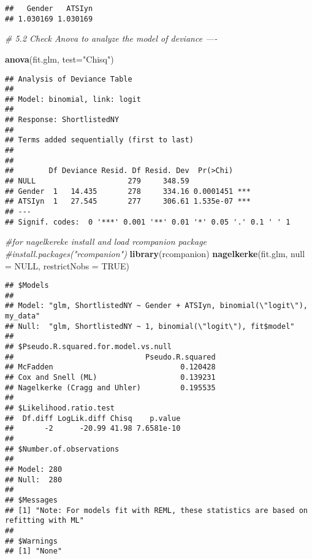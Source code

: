\documentclass[]{article}
\newenvironment{Shaded}{\begin{snugshade}}{\end{snugshade}}
\newcommand{\KeywordTok}[1]{\textcolor[rgb]{0.13,0.29,0.53}{\textbf{#1}}}
\newcommand{\DataTypeTok}[1]{\textcolor[rgb]{0.13,0.29,0.53}{#1}}
\newcommand{\StringTok}[1]{\textcolor[rgb]{0.31,0.60,0.02}{#1}}
\newcommand{\CommentTok}[1]{\textcolor[rgb]{0.56,0.35,0.01}{\textit{#1}}}
\newcommand{\OtherTok}[1]{\textcolor[rgb]{0.56,0.35,0.01}{#1}}
\newcommand{\NormalTok}[1]{#1}
\begin{document}
\begin{verbatim}
##   Gender   ATSIyn 
## 1.030169 1.030169
\end{verbatim}

\begin{Shaded}
\begin{Highlighting}[]
\CommentTok{# 5.2 Check Anova to analyze the model of deviance ----}

\KeywordTok{anova}\NormalTok{(fit.glm, }\DataTypeTok{test=}\StringTok{"Chisq"}\NormalTok{)}
\end{Highlighting}
\end{Shaded}

\begin{verbatim}
## Analysis of Deviance Table
## 
## Model: binomial, link: logit
## 
## Response: ShortlistedNY
## 
## Terms added sequentially (first to last)
## 
## 
##        Df Deviance Resid. Df Resid. Dev  Pr(>Chi)    
## NULL                     279     348.59              
## Gender  1   14.435       278     334.16 0.0001451 ***
## ATSIyn  1   27.545       277     306.61 1.535e-07 ***
## ---
## Signif. codes:  0 '***' 0.001 '**' 0.01 '*' 0.05 '.' 0.1 ' ' 1
\end{verbatim}

\begin{Shaded}
\begin{Highlighting}[]
\CommentTok{#for nagelkereke install and load rcompanion package}
\CommentTok{#install.packages("rcompanion") }
\KeywordTok{library}\NormalTok{(rcompanion)}
\KeywordTok{nagelkerke}\NormalTok{(fit.glm, }\DataTypeTok{null =} \OtherTok{NULL}\NormalTok{, }\DataTypeTok{restrictNobs =} \OtherTok{TRUE}\NormalTok{)}
\end{Highlighting}
\end{Shaded}

\begin{verbatim}
## $Models
##                                                                            
## Model: "glm, ShortlistedNY ~ Gender + ATSIyn, binomial(\"logit\"), my_data"
## Null:  "glm, ShortlistedNY ~ 1, binomial(\"logit\"), fit$model"            
## 
## $Pseudo.R.squared.for.model.vs.null
##                              Pseudo.R.squared
## McFadden                             0.120428
## Cox and Snell (ML)                   0.139231
## Nagelkerke (Cragg and Uhler)         0.195535
## 
## $Likelihood.ratio.test
##  Df.diff LogLik.diff Chisq    p.value
##       -2      -20.99 41.98 7.6581e-10
## 
## $Number.of.observations
##           
## Model: 280
## Null:  280
## 
## $Messages
## [1] "Note: For models fit with REML, these statistics are based on refitting with ML"
## 
## $Warnings
## [1] "None"
\end{verbatim}
\end{document}
